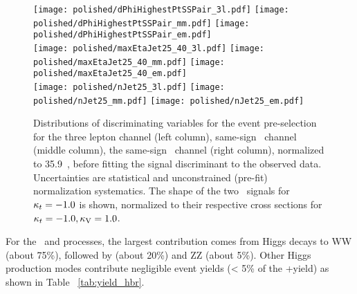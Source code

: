 \begin{figure}[!htb]
\centering
        \texttt{[image: polished/dPhiHighestPtSSPair\_3l.pdf]}
        \texttt{[image: polished/dPhiHighestPtSSPair\_mm.pdf]}              
        \texttt{[image: polished/dPhiHighestPtSSPair\_em.pdf]}\\
        \texttt{[image: polished/maxEtaJet25\_40\_3l.pdf]}
        \texttt{[image: polished/maxEtaJet25\_40\_mm.pdf]}
        \texttt{[image: polished/maxEtaJet25\_40\_em.pdf]}\\  
        \texttt{[image: polished/nJet25\_3l.pdf]}                    
        \texttt{[image: polished/nJet25\_mm.pdf]} 
        \texttt{[image: polished/nJet25\_em.pdf]} 
\caption[Discriminating variables for the event pre-selection.]{Distributions of discriminating variables for the event pre-selection for the three lepton channel (left column), same-sign \mumu\ channel (middle column), the same-sign \emu\ channel (right column), normalized to 35.9\ \fbinv, before fitting the signal discriminant to the observed data. Uncertainties are statistical and unconstrained (pre-fit) normalization systematics. The shape of the two \tH\ signals for $\kappa_t=-1.0$ is shown, normalized to their respective cross sections for $\kappa_t=-1.0, \kappa_\text{V}=1.0$.}
\label{fig:input_vars_presel}
\end{figure}

For the \tH\ and \ttH processes, the largest contribution comes from Higgs decays to WW (about 75\%), followed by \tautau (about 20\%) and ZZ (about 5\%). Other Higgs production modes contribute negligible event yields (< 5\% of the \tH +\ttH yield) as shown in Table ~\ref{tab:yield_hbr}.


